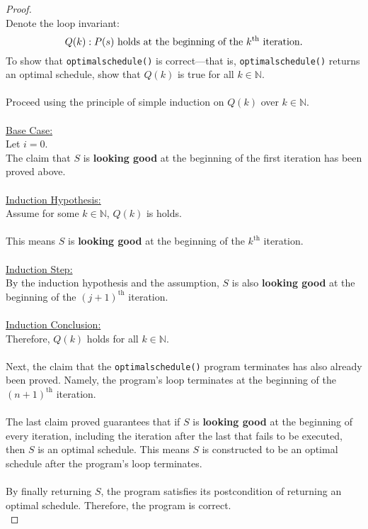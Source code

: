 \documentclass[12pt]{article}
\begin{document}
\begin{proof}
\leavevmode\\
    Denote the loop invariant:
    \[
        Q(k): P(s) \text{ holds at the beginning of the \( k ^{\text{th}} \) iteration.}
    \]
    To show that \texttt{optimalschedule()} is correct—that is, \texttt{optimalschedule()} returns an optimal schedule, show that \( Q(k) \) is true for all \( k \in \mathbb{N} \). \\
    \\
    Proceed using the principle of simple induction on \( Q(k) \) over \( k \in \mathbb{N} \). \\
    \\
    \underline{Base Case:} \\
    Let \( i = 0 \). \\
    The claim that \( S \) is \textbf{looking good} at the beginning of the first iteration has been proved above. \\
    \\
    \underline{Induction Hypothesis:} \\
    Assume for some \( k \in \mathbb{N} \), \( Q(k) \) is holds. \\
    \\
    This means \( S \) is \textbf{looking good} at the beginning of the \( k^{\text{th}} \) iteration. \\
    \\
    \underline{Induction Step:} \\
    By the induction hypothesis and the assumption, \( S \) is also \textbf{looking good} at the beginning of the \( (j + 1)^{\text{th}} \) iteration. \\
    \\
    \underline{Induction Conclusion:} \\
    Therefore, \( Q(k) \) holds for all \( k \in \mathbb{N} \). \\
    \\
    Next, the claim that the \texttt{optimalschedule()} program terminates has also already been proved. Namely, the program's loop terminates at the beginning of the \( (n + 1)^{\text{th}} \) iteration. \\
    \\
    The last claim proved guarantees that if \( S \) is \textbf{looking good} at the beginning of every iteration, including the iteration after the last that fails to be executed, then \( S \) is an optimal schedule. This means \( S \) is constructed to be an optimal schedule after the program's loop terminates. \\
    \\
    By finally returning \( S \), the program satisfies its postcondition of returning an optimal schedule. Therefore, the program is correct. \\
\end{proof}
\pagebreak
\end{document}
